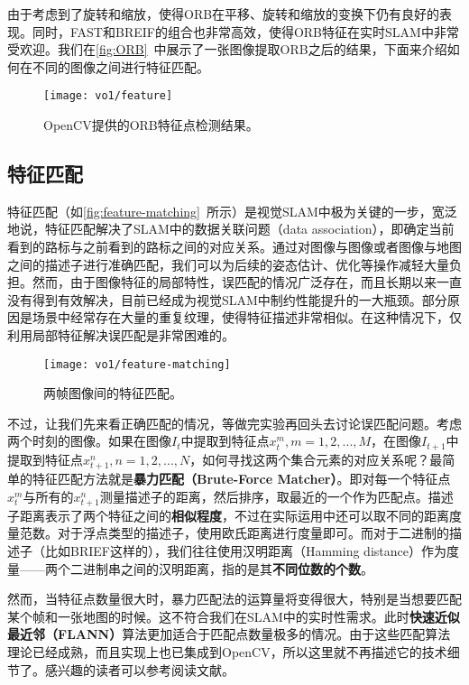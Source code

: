 由于考虑到了旋转和缩放，使得ORB在平移、旋转和缩放的变换下仍有良好的表现。同时，FAST和BREIF的组合也非常高效，使得ORB特征在实时SLAM中非常受欢迎。我们在\autoref{fig:ORB}~中展示了一张图像提取ORB之后的结果，下面来介绍如何在不同的图像之间进行特征匹配。

\begin{figure}[!htp]
    \centering
    \texttt{[image: vo1/feature]}\\
    \caption{OpenCV提供的ORB特征点检测结果。}
    \label{fig:ORB}
\end{figure}

\subsection{特征匹配}

特征匹配（如\autoref{fig:feature-matching}~所示）是视觉SLAM中极为关键的一步，宽泛地说，特征匹配解决了SLAM中的数据关联问题（data association），即确定当前看到的路标与之前看到的路标之间的对应关系。通过对图像与图像或者图像与地图之间的描述子进行准确匹配，我们可以为后续的姿态估计、优化等操作减轻大量负担。然而，由于图像特征的局部特性，误匹配的情况广泛存在，而且长期以来一直没有得到有效解决，目前已经成为视觉SLAM中制约性能提升的一大瓶颈。部分原因是场景中经常存在大量的重复纹理，使得特征描述非常相似。在这种情况下，仅利用局部特征解决误匹配是非常困难的。

\begin{figure}[!htp]
    \centering
    \texttt{[image: vo1/feature-matching]}
    \caption{两帧图像间的特征匹配。}
    \label{fig:feature-matching}
\end{figure}

不过，让我们先来看正确匹配的情况，等做完实验再回头去讨论误匹配问题。考虑两个时刻的图像。如果在图像$I_{t}$中提取到特征点$ x_{t}^{m}, m=1,2,...,M$，在图像$I_{t+1}$中提取到特征点$x_{t+1}^{n}, n=1,2,...,N$，如何寻找这两个集合元素的对应关系呢？最简单的特征匹配方法就是\textbf{暴力匹配（Brute-Force Matcher）}。即对每一个特征点$x_{t}^{m}$与所有的$x_{t+1}^{n}$测量描述子的距离，然后排序，取最近的一个作为匹配点。描述子距离表示了两个特征之间的\textbf{相似程度}，不过在实际运用中还可以取不同的距离度量范数。对于浮点类型的描述子，使用欧氏距离进行度量即可。而对于二进制的描述子（比如BRIEF这样的），我们往往使用汉明距离（Hamming distance）作为度量——两个二进制串之间的汉明距离，指的是其\textbf{不同位数的个数}。

然而，当特征点数量很大时，暴力匹配法的运算量将变得很大，特别是当想要匹配某个帧和一张地图的时候。这不符合我们在SLAM中的实时性需求。此时\textbf{快速近似最近邻（FLANN）}算法更加适合于匹配点数量极多的情况。由于这些匹配算法理论已经成熟，而且实现上也已集成到OpenCV，所以这里就不再描述它的技术细节了。感兴趣的读者可以参考阅读文献\cite{Muja2009}。

